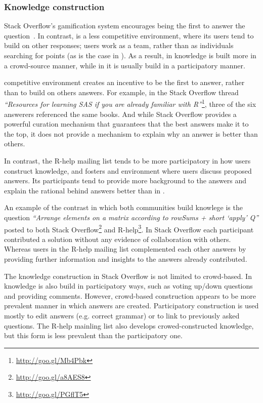 \subsubsection{Knowledge construction}

Stack Overflow's gamification system encourages being the first to answer the question~\cite{Singer2013}. In contrast, \RH is a less competitive environment,
where its users tend to build on other
responses; \RH users work as a team, rather than as individuals searching for points (as is the case in \SO).
As 
a result, in \SO knowledge is built more in a crowd-source manner, while in \RH it is usually build in a participatory manner.

\SO competitive environment creates an incentive to be the first to answer, rather than to build on others answers.
For example, in the Stack Overflow thread \textit{``Resources for learning SAS if you are already familiar with R''}\footnote{\url{http://goo.gl/Mb4Pbk}}, three of the six answerers referenced the same books.
And while Stack Overflow provides a powerful curation mechanism that guarantees that the best answers make it to the top, it does not provide a mechanism to explain why an
answer is better than others.

In contrast, the R-help mailing list tends to be more participatory in how users construct knowledge, and fosters and environment where users discuss proposed
answers. Its participants tend to provide more background to the answers and explain the rational behind answers  better than in \SO.

An example of the contrast in which both communities build knowlege is the question \textit{``Arrange elements on a matrix according to rowSums + short `apply' Q''}  posted to both Stack Overflow\footnote{\url{http://goo.gl/a8AES8}} and {R-help}\footnote{\url{http://goo.gl/PGflT5}}.
In Stack Overflow each participant contributed a solution without any evidence of collaboration with others.
Whereas users in the R-help mailing list complemented each other answers by providing further information and insights to the answers already contributed.
    
The knowledge construction in Stack Overflow is not limited to crowd-based.  In \SO knowledge is also build in participatory ways, such as
voting up/down questions and providing comments.  However, crowd-based construction appears to be more prevalent manner in which answers are
created. Participatory construction is used mostly to edit answers (e.g. correct grammar) or to link to previously asked questions.
The R-help mainling list also develops crowed-constructed knowledge, but this form is less prevalent than the participatory one.

